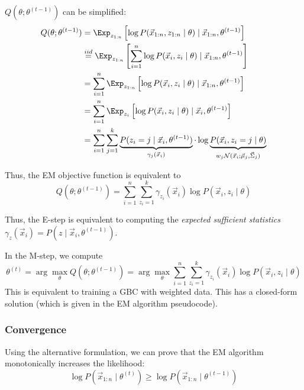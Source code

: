 $Q(\theta; \theta^{(t-1)})$ can be simplified:
\begin{align*}
        Q(\theta; \theta^{(t-1)}) &=
    \Exp_{z_{1:n}}\left[
        \log{P(\vec{x}_{1:n}, z_{1:n} \mid \theta)} \mid \vec{x}_{1:n}, \theta^{(t-1)}
    \right] \\
    &\overset{iid}{=} \Exp_{z_{1:n}}\left[
        \sum_{i=1}^n{
        \log{P(\vec{x}_i, z_i \mid \theta)} \mid \vec{x}_{1:n}, \theta^{(t-1)}
        }
    \right] \\
    &= \sum_{i=1}^n{ \Exp_{z_{1:n}}\left[
        \log{P(\vec{x}_i, z_i \mid \theta)} \mid \vec{x}_{1:n}, \theta^{(t-1)}
    \right]
    } \\
    &= \sum_{i=1}^n{ \Exp_{z_i}\left[
        \log{P(\vec{x}_i, z_i \mid \theta)} \mid \vec{x}_i, \theta^{(t-1)}
    \right]
    } \\
    &= \sum_{i=1}^n{
        \sum_{j=1}^k{
            \underbrace{P(z_i = j \mid \vec{x}_i, \theta^{(t-1)})}_{\gamma_j(\vec{x}_i)}
            \cdot
            \log{\underbrace{P(\vec{x}_i, z_i = j \mid \theta)}_{w_j \mathcal{N}(\vec{x}_i; \vec{\mu}_j, \vec{\Sigma}_j)}}
        }
    }
\end{align*}

Thus, the EM objective function is equivalent to
\begin{equation*}
    Q(\theta; \theta^{(t-1)})
    = \sum_{i=1}^n{\sum_{z_i=1}^k{
        \gamma_{z_i}(\vec{x}_i)
        \log{P(\vec{x}_i, z_i \mid \theta)}
    }}
\end{equation*}

Thus, the E-step is equivalent to computing
the \emph{expected sufficient statistics}
$\gamma_z(\vec{x}_i) = P(z \mid \vec{x}_i, \theta^{(t-1)})$.

In the M-step, we compute
\begin{equation*}
    \theta^{(t)} = \arg\max_\theta{
        Q(\theta; \theta^{(t-1)})
    }
    = \arg\max_\theta{
        \sum_{i=1}^n{
        \sum_{z_i=1}^k{
            \gamma_{z_i}(\vec{x}_i)
            \log{P(\vec{x}_i, z_i \mid \theta)}
        }
        }
    }
\end{equation*}
This is equivalent to training a GBC with
weighted data.
This has a closed-form solution
(which is given in the EM algorithm pseudocode).

\subsubsection{Convergence}
Using the alternative formulation,
we can prove that the EM algorithm
monotonically increases the likelihood:
\begin{equation*}
    \log{P(\vec{x}_{1:n} \mid \theta^{(t)})}
    \geq
    \log{P(\vec{x}_{1:n} \mid \theta^{(t-1)})}
\end{equation*}

